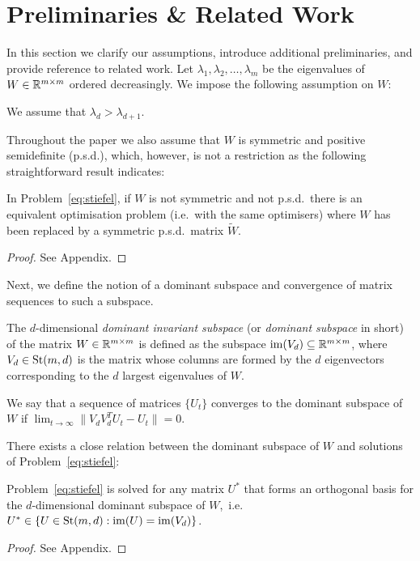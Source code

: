 \documentclass{article}
\begin{document}
\section{Preliminaries \& Related Work}\label{sec:bg}
%
In this section we clarify our assumptions, introduce additional preliminaries, and provide reference to related work.
%
%
Let $\lambda_1, \lambda_2, \ldots, \lambda_m$ be the eigenvalues of $W \in \mathbb{R}^{m \times m}$ ordered decreasingly. We impose the following assumption on $W$:
\begin{assumption}
We assume that $\lambda_d > \lambda_{d+1}$.
\end{assumption}
Throughout the paper we also assume that $W$ is symmetric and positive semidefinite (p.s.d.), which, however, is not a restriction as the following straightforward result indicates:
\begin{lemma}\label{ass:sympsd}
In Problem~\eqref{eq:stiefel}, if  $W$ is not symmetric and not p.s.d.~there is an equivalent optimisation problem (i.e.~with the same optimisers) where $W$ has been replaced by a symmetric p.s.d.~matrix $\tilde W$.
\end{lemma}
\begin{proof}
See Appendix.
\end{proof}

Next, we define the notion of a dominant subspace and convergence of matrix sequences to such a subspace.
\begin{definition}\label{def:domsub}
 The $d$-dimensional \emph{dominant invariant subspace} (or \emph{dominant subspace} in short) of the matrix $W \in \mathbb{R}^{m \times m}$ is defined as the subspace $\operatorname{im}(V_d) \subseteq \mathbb{R}^{m \times m}$, where $V_d \in \operatorname{St}(m,d)$ is the matrix whose columns are formed by the $d$ eigenvectors corresponding to the $d$ largest eigenvalues of $W$. 
\end{definition}

\begin{definition}[Convergence]
We say that a sequence of matrices $\{U_t\}$ converges to the dominant subspace of $W$ if  %
$\lim_{t \rightarrow \infty} \| V_dV_d^TU_t - U_t \| = 0$.
\end{definition}
%

There exists a close relation between the dominant subspace of $W$ and solutions of Problem~\eqref{eq:stiefel}:
%
\begin{lemma}\label{lem:solprob}
%
Problem~\eqref{eq:stiefel} is solved for any matrix $U^*$ that forms an orthogonal basis for the $d$-dimensional dominant subspace of $W$,~i.e.~$U^* \in \{ U \in \operatorname{St}(m,d) : \operatorname{im}(U) = \operatorname{im}(V_d)\}$.
\end{lemma}
\begin{proof}
See Appendix.
\end{proof}
\end{document}
